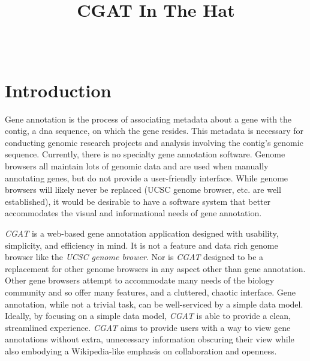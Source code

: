 \documentclass[10pt, conference, compsocconf]{IEEEtran}
\begin{document}
\title{CGAT In The Hat}


\author{
\\
}

\maketitle

\thispagestyle{empty}
\pagestyle{empty}

\section{Introduction}\label{sec:introduction}
Gene annotation is the process of associating metadata about a gene with the
contig, a dna sequence, on which the gene resides. This metadata is necessary for conducting
genomic research projects and analysis involving the contig's genomic sequence.
Currently, there is no specialty gene annotation software. Genome browsers
all maintain lots of genomic data and are used when manually annotating genes,
but do not provide a user-friendly interface. While genome browsers
will likely never be replaced (UCSC genome browser, etc. are well
established), it would be desirable to have a software system that better
accommodates the visual and informational needs of gene annotation.

\textit{CGAT} is a web-based gene annotation application designed with
usability, simplicity, and efficiency in mind. It is not a feature and data
rich genome browser like the \textit{UCSC genome brower}. Nor is \textit{CGAT}
designed to be a replacement for other genome browsers in any aspect other than
gene annotation. Other gene browsers attempt to accommodate many needs of the
biology community and so offer many features, and a cluttered, chaotic
interface. Gene annotation, while not a trivial task, can be well-serviced by a
simple data model. Ideally, by focusing on a simple data model, \textit{CGAT}
is able to provide a clean, streamlined experience. \textit{CGAT} aims to
provide users with a way to view gene annotations without extra, unnecessary
information obscuring their view while also embodying a Wikipedia-like emphasis
on collaboration and openness.
\end{document}
